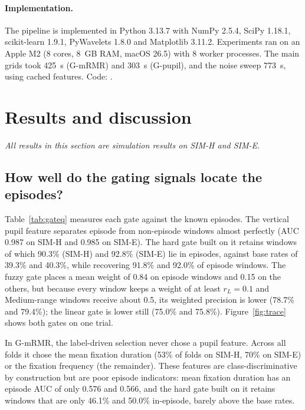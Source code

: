 \paragraph{Implementation.} The pipeline is implemented in Python 3.13.7 with NumPy 2.5.4, SciPy 1.18.1, scikit-learn 1.9.1, PyWavelets 1.8.0 and Matplotlib 3.11.2. Experiments ran on an Apple M2 (8 cores, 8~GB RAM, macOS 26.5) with 8 worker processes. The main grids took 425~s (G-mRMR) and 303~s (G-pupil), and the noise sweep 773~s, using cached features. Code: .

\section{Results and discussion}
\label{sec:results}

\noindent\emph{All results in this section are simulation results\simnote{} on SIM-H and SIM-E.}

\subsection{How well do the gating signals locate the episodes?}
Table~\ref{tab:gateq} measures each gate against the known episodes. The vertical pupil feature separates episode from non-episode windows almost perfectly (AUC 0.987 on SIM-H and 0.985 on SIM-E). The hard gate built on it retains windows of which 90.3\% (SIM-H) and 92.8\% (SIM-E) lie in episodes, against base rates of 39.3\% and 40.3\%, while recovering 91.8\% and 92.0\% of episode windows. The fuzzy gate places a mean weight of 0.84 on episode windows and 0.15 on the others, but because every window keeps a weight of at least $r_L=0.1$ and Medium-range windows receive about 0.5, its weighted precision is lower (78.7\% and 79.4\%); the linear gate is lower still (75.0\% and 75.8\%). Figure~\ref{fig:trace} shows both gates on one trial.

In G-mRMR, the label-driven selection never chose a pupil feature. Across all folds it chose the mean fixation duration (53\% of folds on SIM-H, 70\% on SIM-E) or the fixation frequency (the remainder). These features are class-discriminative by construction but are poor episode indicators: mean fixation duration has an episode AUC of only 0.576 and 0.566, and the hard gate built on it retains windows that are only 46.1\% and 50.0\% in-episode, barely above the base rates.

\begin{table}[t]
\centering\scriptsize
\caption{Gate quality against the known episodes\simnote{} (all 900 windows per dataset). w-prec.: weighted precision}\label{tab:gateq}

\end{table}

